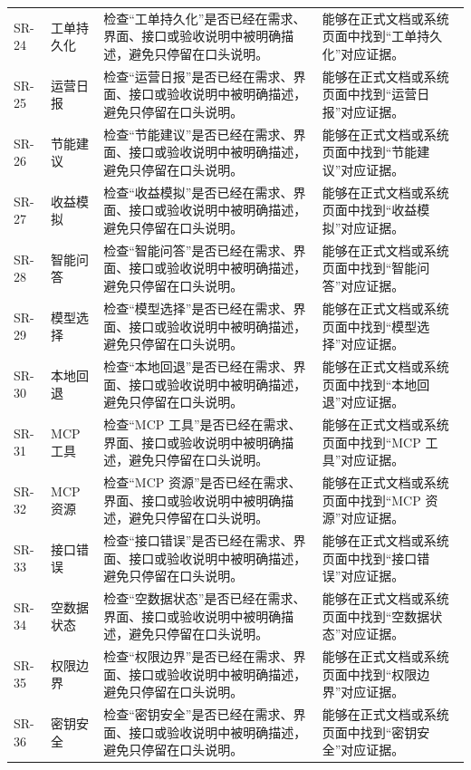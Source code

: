 \documentclass[12pt,a4paper]{ctexart}
\begin{document}
\begin{longtable}{L{1.7cm}L{3.0cm}L{6.2cm}L{4.4cm}}
SR-24 & 工单持久化 & 检查“工单持久化”是否已经在需求、界面、接口或验收说明中被明确描述，避免只停留在口头说明。 & 能够在正式文档或系统页面中找到“工单持久化”对应证据。 \\
SR-25 & 运营日报 & 检查“运营日报”是否已经在需求、界面、接口或验收说明中被明确描述，避免只停留在口头说明。 & 能够在正式文档或系统页面中找到“运营日报”对应证据。 \\
SR-26 & 节能建议 & 检查“节能建议”是否已经在需求、界面、接口或验收说明中被明确描述，避免只停留在口头说明。 & 能够在正式文档或系统页面中找到“节能建议”对应证据。 \\
SR-27 & 收益模拟 & 检查“收益模拟”是否已经在需求、界面、接口或验收说明中被明确描述，避免只停留在口头说明。 & 能够在正式文档或系统页面中找到“收益模拟”对应证据。 \\
SR-28 & 智能问答 & 检查“智能问答”是否已经在需求、界面、接口或验收说明中被明确描述，避免只停留在口头说明。 & 能够在正式文档或系统页面中找到“智能问答”对应证据。 \\
SR-29 & 模型选择 & 检查“模型选择”是否已经在需求、界面、接口或验收说明中被明确描述，避免只停留在口头说明。 & 能够在正式文档或系统页面中找到“模型选择”对应证据。 \\
SR-30 & 本地回退 & 检查“本地回退”是否已经在需求、界面、接口或验收说明中被明确描述，避免只停留在口头说明。 & 能够在正式文档或系统页面中找到“本地回退”对应证据。 \\
SR-31 & MCP 工具 & 检查“MCP 工具”是否已经在需求、界面、接口或验收说明中被明确描述，避免只停留在口头说明。 & 能够在正式文档或系统页面中找到“MCP 工具”对应证据。 \\
SR-32 & MCP 资源 & 检查“MCP 资源”是否已经在需求、界面、接口或验收说明中被明确描述，避免只停留在口头说明。 & 能够在正式文档或系统页面中找到“MCP 资源”对应证据。 \\
SR-33 & 接口错误 & 检查“接口错误”是否已经在需求、界面、接口或验收说明中被明确描述，避免只停留在口头说明。 & 能够在正式文档或系统页面中找到“接口错误”对应证据。 \\
SR-34 & 空数据状态 & 检查“空数据状态”是否已经在需求、界面、接口或验收说明中被明确描述，避免只停留在口头说明。 & 能够在正式文档或系统页面中找到“空数据状态”对应证据。 \\
SR-35 & 权限边界 & 检查“权限边界”是否已经在需求、界面、接口或验收说明中被明确描述，避免只停留在口头说明。 & 能够在正式文档或系统页面中找到“权限边界”对应证据。 \\
SR-36 & 密钥安全 & 检查“密钥安全”是否已经在需求、界面、接口或验收说明中被明确描述，避免只停留在口头说明。 & 能够在正式文档或系统页面中找到“密钥安全”对应证据。 \\

\end{longtable}
\end{document}
